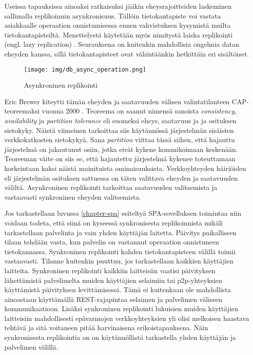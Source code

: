 \documentclass[finnish,twoside,censored,csm,sw-track-2018]{HYthesisML}
\begin{document}
Useissa tapauksissa ainoaksi ratkaisuksi jääkin eheysrajoitteiden laskeminen sallimalla replikoinnin asynkronisuus. Tällöin tietokantapiste voi vastata asiakkaalle operaation onnistumisessa ennen vahvistuksen kysymistä muilta tietokantapisteiltä. Menettelystä käytetään myös nimitystä laiska replikointi (engl. lazy replication) \citep{gray-replication}. Seurauksena on kuitenkin mahdollisia ongelmia datan eheyden kanssa, sillä tietokantapisteet ovat vähintäänkin hetkittäin eri sisältöiset.

\begin{figure}[ht]
  \centering
    \texttt{[image: img/db\_async\_operation.png]}
  \caption{Asynkroninen replikointi}
  \label{fig-async-replikointi}
\end{figure}

Eric Brewer kiteytti tämän eheyden ja saatavuuden välisen valintatilanteen CAP-teoreemaksi vuonna 2000 \cite{CAP}. Teoreema on saanut nimensä sanoista \textit{consistency}, \textit{availability} ja \textit{partition tolerance} eli suomeksi eheys, saatavuus ja ja osituksen sietokyky. Näistä viimeinen tarkoittaa siis käytännössä järjestelmän sisäisten verkkokatkosten sietokykyä. Sana \textit{partition} viittaa tässä siihen, että hajauttu järjestelmä on jakautunut osiin, jotka eivät kykene kommikoimaan keskenään. Teoreeman väite on siis se, että hajautettu järjestelmä kykenee toteuttamaan korkeintaan kaksi näistä mainituista ominaisuuksista. Verkkoyhteyden häiriöiden eli järjestelmän osituksen sattuessa on täten valittava eheyden ja saatavuuden väliltä. Asynkroninen replikointi tarkoittaa saatavuuden valitsemista ja vastaavasti synkroninen eheyden valitsemista.

Jos tarkastellaan luvussa \ref{chapter-spa} esiteltyä SPA-sovelluksen toimintaa niin voidaan todeta, että siinä on kyseessä synkronisesta replikoinnista mikäli tarkastellaan palvelinta ja vain yhden käyttäjän laitetta. Päivitys paikalliseen tilaan tehdään vasta, kun palvelin on vastannut operaation onnistuneen tietokannassa. Synkroninen replikointi kahden tietokantapisteen välillä toimii vastaavasti. Tilanne kuitenkin puuttuu, jos tarkastellaan kaikkien käyttäjien laitteita. Synkroninen replikointi kaikkiin laitteisiin vaatisi päivityksen lähettämistä palvelimelta muiden käyttäjien selaimiin tai p2p-yhteyksien käyttämistä päivityksen levittämisessä. Tämä ei kuitenkaan ole mahdollista ainoastaan käyttämällä REST-rajapintaa selaimen ja palvelimen väliseen kommunikaatioon. Lisäksi synkroninen replikointi lukuisien muiden käyttäjien laitteisiin mahdollisesti epävarmojen verkkoyhteyksien yli olisi melkoisen haastava tehtävä ja sitä voitaneen pitää harvinaisena erikoistapauksena. Näin synkronisesta replikointia on on käytännöllistä tarkastella yhden käyttäjän ja palvelimen välillä.
\end{document}
